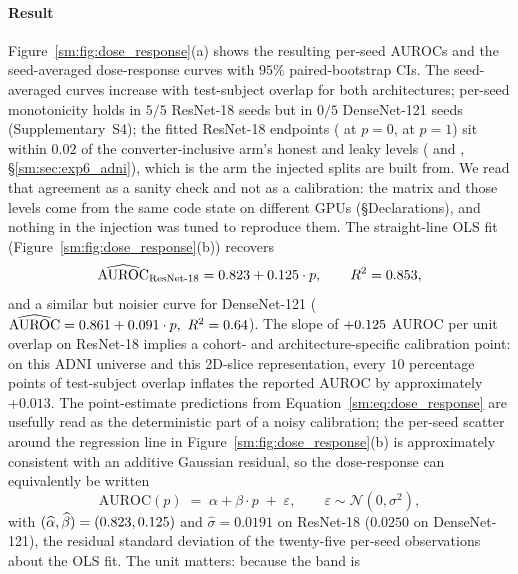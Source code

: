 \documentclass[11pt]{article}
\begin{document}
\paragraph{Result}
Figure~\ref{sm:fig:dose_response}(a) shows the resulting per-seed AUROCs
and the seed-averaged dose-response curves with $95\%$ paired-bootstrap
CIs. The seed-averaged curves increase with test-subject overlap for
both architectures; per-seed monotonicity holds in $5/5$ ResNet-18 seeds
but in $0/5$ DenseNet-121 seeds (Supplementary~S4);
the fitted ResNet-18 endpoints
(\DoseAtZero{} at $p=0$, \DoseAtOne{} at $p=1$) sit within $0.02$ of
the converter-inclusive arm's honest and leaky levels
(\AdniConvSafeAUROC{} and \AdniConvRandomAUROC{},
\S\ref{sm:sec:exp6_adni}), which is the arm the injected splits are built
from. We read that agreement as a sanity check and not as a
calibration: the matrix and those levels come from the same code state
on different GPUs (\S Declarations), and nothing in the injection was
tuned to reproduce them. The straight-line OLS fit
(Figure~\ref{sm:fig:dose_response}(b)) recovers
\begin{equation}
\widehat{\mathrm{AUROC}}_{\text{ResNet-18}}
   = 0.823{} + 0.125{} \cdot p, \qquad R^2 = 0.853{},
\label{sm:eq:dose_response}
\end{equation}
and a similar but noisier curve for DenseNet-121
($\widehat{\mathrm{AUROC}} = 0.861{} + 0.091{}
\cdot p,\ R^2=0.64$).
The slope of $+0.125{}$ AUROC per unit overlap on
ResNet-18 implies a cohort- and architecture-specific calibration
point: on this ADNI universe and this 2D-slice representation, every
$10$ percentage points of test-subject overlap inflates the reported
AUROC by approximately $+0.013$. The point-estimate predictions from
Equation~\ref{sm:eq:dose_response} are usefully read as the
deterministic part of a noisy calibration; the per-seed scatter
around the regression line in
Figure~\ref{sm:fig:dose_response}(b) is approximately consistent with an
additive Gaussian residual, so the dose-response can equivalently be
written
\begin{equation}
\mathrm{AUROC}(p) \;=\; \alpha + \beta \cdot p \;+\; \varepsilon,
\qquad \varepsilon \sim \mathcal{N}(0, \sigma^2),
\label{sm:eq:dose_response_noisy}
\end{equation}
with $(\widehat{\alpha},\widehat{\beta}) = (0.823{}, 0.125{})$ and
$\widehat{\sigma} = 0.0191$ on ResNet-18 ($0.0250$ on DenseNet-121),
the residual standard deviation of the twenty-five per-seed
observations about the OLS fit. The unit matters: because the band is
\end{document}
